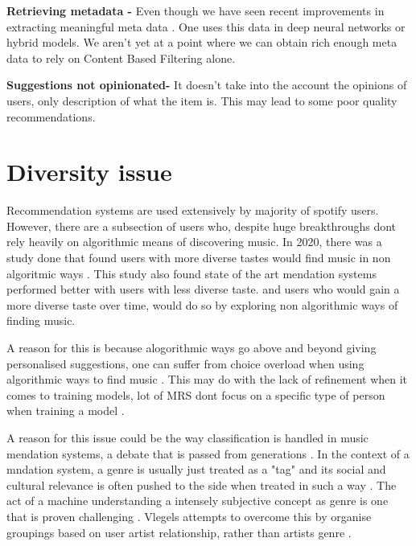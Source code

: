\textbf{Retrieving metadata - } Even though we have seen recent improvements in extracting meaningful meta data \citep{vall_feature-combination_2019} \citep{singh_novel_2022}. One uses this data in deep neural networks or hybrid models. We aren't yet at a point where we can obtain rich enough meta data to rely on Content Based Filtering alone.

\textbf{Suggestions not opinionated- } It doesn't take into the account the opinions of users, only description of what the item is. This may lead to some poor quality recommendations.  


\section{Diversity issue}

Recommendation systems are used extensively by majority of spotify users. However, there are a subsection of users who, despite huge breakthroughs dont rely heavily on algorithmic means of discovering music. In 2020, there was a study done that found users with more diverse tastes would find music in non algoritmic ways \citep{anderson_algorithmic_2020}. This study also found state of the art mendation systems performed better with users with less diverse taste. and users who would gain a more diverse taste over time, would do so by exploring non algorithmic ways of finding music.

A reason for this is because alogorithmic ways go above and beyond giving personalised suggestions, one can suffer from choice overload when using algorithmic ways to find music \citep{iyengar_rethinking_1999}. This may do with the lack of refinement when it comes to training models, lot of MRS dont focus on a specific type of person when training a model \citep{laplante_improving_2014}.

A reason for this issue could be the way classification is handled in music mendation systems, a debate that is passed from generations \citep{moles_sociodynamique_2019} \citep{dimaggio_classification_1987} \citep{bourdieu_distinction_2010}. In the context of a mndation system, a genre is usually just treated as a "tag" and its social and cultural relevance is often pushed to the side when treated in such a way \citep{porcaro_diversity_2021}. The act of a machine understanding a intensely subjective concept as genre is one that is proven challenging \citep{nurnberger_survey_2014}. Vlegels attempts to overcome this by organise groupings based on user artist relationship, rather than artists genre \citep{vlegels_music_2017}.

